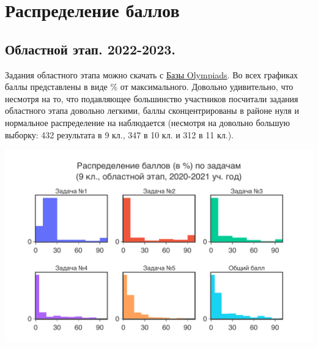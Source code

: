 \section{Распределение баллов}

\subsection{Областной этап. 2022-2023.}
Задания областного этапа можно скачать с \href{https://olympiads.bc-pf.org/chemistry/oblast/2023}{Базы Olympiads}. Во всех графиках баллы представлены в виде \% от максимального. Довольно удивительно, что несмотря на то, что подавляющее большинство участников посчитали задания областного этапа довольно легкими, баллы сконцентрированы в районе нуля и нормальное распределение на наблюдается (несмотря на довольно большую выборку: 432 результата в 9 кл., 347 в 10 кл. и 312 в 11 кл.).

\includegraphics[width=\linewidth]{../export/pdf/results/2023/oblast/grade9-dist-problemwise.pdf}
\newpage

